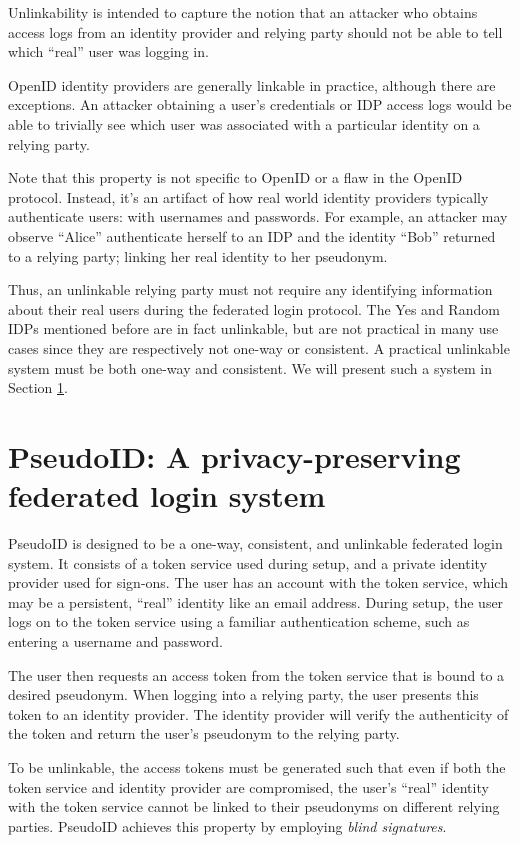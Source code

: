 \documentclass{llncs}
\begin{document}
Unlinkability is intended to capture the notion that an attacker who
obtains access logs from an identity provider and relying party should
not be able to tell which ``real'' user was logging in.

OpenID identity providers are generally linkable in practice, although
there are exceptions. An attacker obtaining a user's credentials or
IDP access logs would be able to trivially see which user was
associated with a particular identity on a relying party.

Note that this property is not specific to OpenID or a flaw in the
OpenID protocol. Instead, it's an artifact of how real world identity
providers typically authenticate users: with usernames and
passwords. For example, an attacker may observe ``Alice'' authenticate
herself to an IDP and the identity ``Bob'' returned to a relying
party; linking her real identity to her pseudonym.

Thus, an unlinkable relying party must not require any identifying
information about their real users during the federated login
protocol. The Yes and Random IDPs mentioned before are in fact
unlinkable, but are not practical in many use cases since they are
respectively not one-way or consistent. A practical unlinkable system
must be both one-way and consistent. We will present such a system in
Section \ref{sec:pseudoid}.

\section{PseudoID: A privacy-preserving federated login system}
\label{sec:pseudoid}

PseudoID is designed to be a one-way, consistent, and unlinkable
federated login system. It consists of a token service used during
setup, and a private identity provider used for sign-ons. The user has
an account with the token service, which may be a persistent, ``real''
identity like an email address. During setup, the user logs on to the
token service using a familiar authentication scheme, such as entering
a username and password.

The user then requests an access token from the token service that is
bound to a desired pseudonym. When logging into a relying party, the
user presents this token to an identity provider. The identity
provider will verify the authenticity of the token and return the
user's pseudonym to the relying party.

To be unlinkable, the access tokens must be generated such that even
if both the token service and identity provider are compromised, the
user's ``real'' identity with the token service cannot be linked to
their pseudonyms on different relying parties. PseudoID achieves this
property by employing \textit{blind signatures}.
\end{document}
